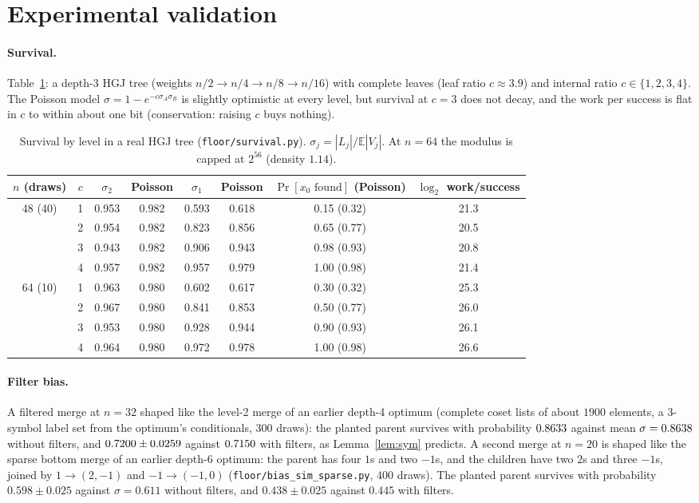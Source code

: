 \documentclass[11pt]{article}
\theoremstyle{definition}
\theoremstyle{remark}
\begin{document}
\section{Experimental validation}\label{sec:exp}
\paragraph{Survival.} Table~\ref{tab:survival}: a depth-3 HGJ tree (weights $n/2\to n/4\to n/8\to n/16$) with complete
leaves (leaf ratio $c\approx3.9$) and internal ratio $c\in\{1,2,3,4\}$. The Poisson model
$\sigma=1-e^{-c\sigma_A\sigma_B}$ is slightly optimistic at every level, but survival at $c=3$ does not decay, and the
work per success is flat in $c$ to within about one bit (conservation: raising $c$ buys nothing).
\begin{table}[ht]
\centering\small
\begin{tabular}{cccccccc}
\toprule
$n$ (draws) & $c$ & $\sigma_2$ & Poisson & $\sigma_1$ & Poisson & $\Pr[x_0\text{ found}]$ (Poisson) & $\log_2$ work/success \\
\midrule
48 (40) & 1 & 0.953 & 0.982 & 0.593 & 0.618 & 0.15 (0.32) & 21.3 \\
 & 2 & 0.954 & 0.982 & 0.823 & 0.856 & 0.65 (0.77) & 20.5 \\
 & 3 & 0.943 & 0.982 & 0.906 & 0.943 & 0.98 (0.93) & 20.8 \\
 & 4 & 0.957 & 0.982 & 0.957 & 0.979 & 1.00 (0.98) & 21.4 \\
\midrule
64 (10) & 1 & 0.963 & 0.980 & 0.602 & 0.617 & 0.30 (0.32) & 25.3 \\
 & 2 & 0.967 & 0.980 & 0.841 & 0.853 & 0.50 (0.77) & 26.0 \\
 & 3 & 0.953 & 0.980 & 0.928 & 0.944 & 0.90 (0.93) & 26.1 \\
 & 4 & 0.964 & 0.980 & 0.972 & 0.978 & 1.00 (0.98) & 26.6 \\
\bottomrule
\end{tabular}
\caption{Survival by level in a real HGJ tree (\texttt{floor/survival.py}). $\sigma_j=|L_j|/\mathbb{E}|V_j|$. At $n=64$
the modulus is capped at $2^{56}$ (density $1.14$).}
\label{tab:survival}
\end{table}

\paragraph{Filter bias.} A filtered merge at $n=32$ shaped like the level-2 merge of an earlier depth-4 optimum (complete coset
lists of about $1900$ elements, a $3$-symbol label set from the optimum's conditionals, $300$ draws): the planted
parent survives with probability $0.8633$ against mean $\sigma=0.8638$ without filters, and
$0.7200\pm0.0259$ against $0.7150$ with filters, as Lemma~\ref{lem:sym} predicts. A second merge at $n=20$ is shaped like
the sparse bottom merge of an earlier depth-6 optimum: the parent has four $1$s and two $-1$s, and the children have two
$2$s and three $-1$s, joined by $1\to(2,-1)$ and $-1\to(-1,0)$ (\texttt{floor/bias\_sim\_sparse.py}, $400$ draws).
The planted parent survives with probability $0.598\pm0.025$ against $\sigma=0.611$ without filters, and
$0.438\pm0.025$ against $0.445$ with filters.
\end{document}
